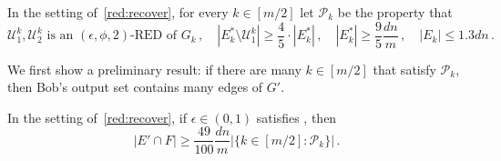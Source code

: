 \begin{definition}
	\label{def:pk}
	In the setting of~\cref{red:recover}, for every $k \in [m/2]$ let $\mathcal{P}_k$ be the property that
	\begin{equation}
		\label{eq:propertypk}
		\text{$\mathcal{U}_1^k,\mathcal{U}_2^k$ is an $(\epsilon,\phi,2)$-RED of  $G_k$}\, ,\quad \left| E^*_k \setminus \mathcal{U}^k_1\right| \ge \frac{4}{5} \cdot \left|E^*_k\right| \, , \quad |E_k^*| \ge \frac{9}{5}\frac{dn}{m}\,, \quad |E_k|\le 1.3 dn\, .
	\end{equation}
\end{definition}
\noindent
We first show a preliminary result: if there are many $k \in [m/2]$ that satisfy $\mathcal{P}_k$, then Bob's output set contains many edges of $G'$.
\begin{lemma}
	\label{lem:almostthere}
	In the setting of~\cref{red:recover}, if $\epsilon \in (0,1)$ satisfies , then
	\begin{equation*}
			|E' \cap F|  \ge \frac{49}{100} \frac{dn}{m}  |\{k\in [m/2] : \mathcal{P}_k\}| \, .
	\end{equation*}
\end{lemma}
